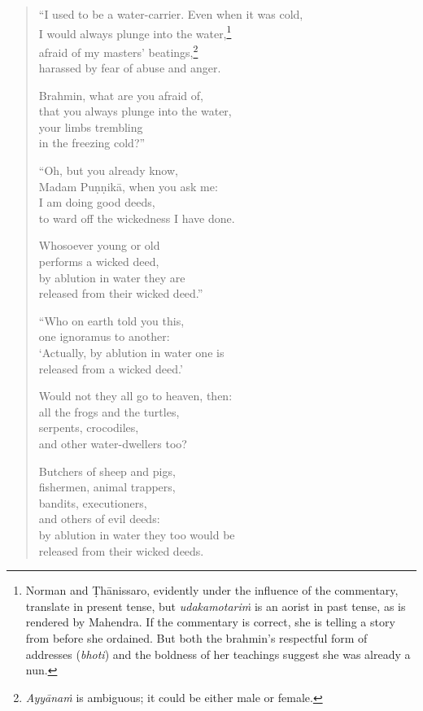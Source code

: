 \documentclass[12pt,openany]{book}%
\begin{document}
\begin{verse}%
“I used to be a water-carrier. Even when it was cold, \\
I would always plunge into the water,\footnote{Norman and \textsanskrit{Ṭhānissaro}, evidently under the influence of the commentary, translate in present tense, but \textit{\textsanskrit{udakamotariṁ}} is an aorist in past tense, as is rendered by Mahendra. If the commentary is correct, she is telling a story from before she ordained. But both the brahmin’s respectful form of addresses (\textit{bhoti}) and the boldness of her teachings suggest she was already a nun. } \\
afraid of my masters’ beatings,\footnote{\textit{\textsanskrit{Ayyānaṁ}} is ambiguous; it could be either male or female. } \\
harassed by fear of abuse and anger. 

Brahmin, what are you afraid of, \\
that you always plunge into the water, \\
your limbs trembling \\
in the freezing cold?” 

“Oh, but you already know, \\
Madam \textsanskrit{Puṇṇikā}, when you ask me: \\
I am doing good deeds, \\
to ward off the wickedness I have done. 

Whosoever young or old \\
performs a wicked deed, \\
by ablution in water they are \\
released from their wicked deed.” 

“Who on earth told you this, \\
one ignoramus to another: \\
‘Actually, by ablution in water one is \\
released from a wicked deed.’ 

Would not they all go to heaven, then: \\
all the frogs and the turtles, \\
serpents, crocodiles, \\
and other water-dwellers too? 

Butchers of sheep and pigs, \\
fishermen, animal trappers, \\
bandits, executioners, \\
and others of evil deeds: \\
by ablution in water they too would be \\
released from their wicked deeds. 


\end{verse}
\end{document}
